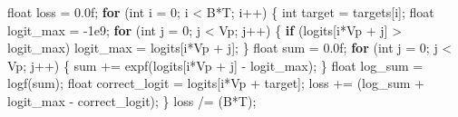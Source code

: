\documentclass[
  letterpaper,
  DIV=11,
  numbers=noendperiod]{scrreprt}
\newenvironment{Shaded}{\begin{snugshade}}{\end{snugshade}}
\newcommand{\BuiltInTok}[1]{\textcolor[rgb]{0.00,0.23,0.31}{#1}}
\newcommand{\ControlFlowTok}[1]{\textcolor[rgb]{0.00,0.23,0.31}{\textbf{#1}}}
\newcommand{\DataTypeTok}[1]{\textcolor[rgb]{0.68,0.00,0.00}{#1}}
\newcommand{\DecValTok}[1]{\textcolor[rgb]{0.68,0.00,0.00}{#1}}
\newcommand{\FloatTok}[1]{\textcolor[rgb]{0.68,0.00,0.00}{#1}}
\newcommand{\NormalTok}[1]{\textcolor[rgb]{0.00,0.23,0.31}{#1}}
\newcommand{\OperatorTok}[1]{\textcolor[rgb]{0.37,0.37,0.37}{#1}}
\begin{document}
\begin{Shaded}
\begin{Highlighting}[]
\DataTypeTok{float}\NormalTok{ loss }\OperatorTok{=} \FloatTok{0.0}\BuiltInTok{f}\OperatorTok{;}
\ControlFlowTok{for} \OperatorTok{(}\DataTypeTok{int}\NormalTok{ i }\OperatorTok{=} \DecValTok{0}\OperatorTok{;}\NormalTok{ i }\OperatorTok{\textless{}}\NormalTok{ B}\OperatorTok{*}\NormalTok{T}\OperatorTok{;}\NormalTok{ i}\OperatorTok{++)} \OperatorTok{\{}
    \DataTypeTok{int}\NormalTok{ target }\OperatorTok{=}\NormalTok{ targets}\OperatorTok{[}\NormalTok{i}\OperatorTok{];}
    \DataTypeTok{float}\NormalTok{ logit\_max }\OperatorTok{=} \OperatorTok{{-}}\FloatTok{1e9}\OperatorTok{;}
    \ControlFlowTok{for} \OperatorTok{(}\DataTypeTok{int}\NormalTok{ j }\OperatorTok{=} \DecValTok{0}\OperatorTok{;}\NormalTok{ j }\OperatorTok{\textless{}}\NormalTok{ Vp}\OperatorTok{;}\NormalTok{ j}\OperatorTok{++)} \OperatorTok{\{}
        \ControlFlowTok{if} \OperatorTok{(}\NormalTok{logits}\OperatorTok{[}\NormalTok{i}\OperatorTok{*}\NormalTok{Vp }\OperatorTok{+}\NormalTok{ j}\OperatorTok{]} \OperatorTok{\textgreater{}}\NormalTok{ logit\_max}\OperatorTok{)}\NormalTok{ logit\_max }\OperatorTok{=}\NormalTok{ logits}\OperatorTok{[}\NormalTok{i}\OperatorTok{*}\NormalTok{Vp }\OperatorTok{+}\NormalTok{ j}\OperatorTok{];}
    \OperatorTok{\}}
    \DataTypeTok{float}\NormalTok{ sum }\OperatorTok{=} \FloatTok{0.0}\BuiltInTok{f}\OperatorTok{;}
    \ControlFlowTok{for} \OperatorTok{(}\DataTypeTok{int}\NormalTok{ j }\OperatorTok{=} \DecValTok{0}\OperatorTok{;}\NormalTok{ j }\OperatorTok{\textless{}}\NormalTok{ Vp}\OperatorTok{;}\NormalTok{ j}\OperatorTok{++)} \OperatorTok{\{}
\NormalTok{        sum }\OperatorTok{+=}\NormalTok{ expf}\OperatorTok{(}\NormalTok{logits}\OperatorTok{[}\NormalTok{i}\OperatorTok{*}\NormalTok{Vp }\OperatorTok{+}\NormalTok{ j}\OperatorTok{]} \OperatorTok{{-}}\NormalTok{ logit\_max}\OperatorTok{);}
    \OperatorTok{\}}
    \DataTypeTok{float}\NormalTok{ log\_sum }\OperatorTok{=}\NormalTok{ logf}\OperatorTok{(}\NormalTok{sum}\OperatorTok{);}
    \DataTypeTok{float}\NormalTok{ correct\_logit }\OperatorTok{=}\NormalTok{ logits}\OperatorTok{[}\NormalTok{i}\OperatorTok{*}\NormalTok{Vp }\OperatorTok{+}\NormalTok{ target}\OperatorTok{];}
\NormalTok{    loss }\OperatorTok{+=} \OperatorTok{(}\NormalTok{log\_sum }\OperatorTok{+}\NormalTok{ logit\_max }\OperatorTok{{-}}\NormalTok{ correct\_logit}\OperatorTok{);}
\OperatorTok{\}}
\NormalTok{loss }\OperatorTok{/=} \OperatorTok{(}\NormalTok{B}\OperatorTok{*}\NormalTok{T}\OperatorTok{);}
\end{Highlighting}
\end{Shaded}
\end{document}

